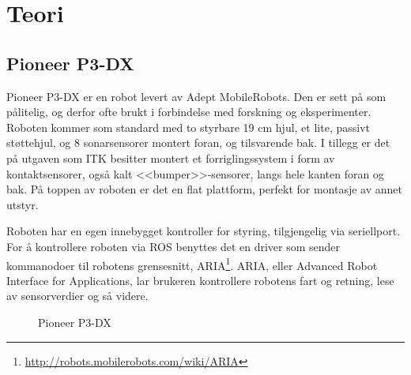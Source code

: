 
\chapter{Teori} %

\label{ch:teori} %


\section{Pioneer P3-DX}

Pioneer P3-DX er en robot levert av Adept MobileRobots. Den er sett på som pålitelig, og derfor ofte brukt i forbindelse med forskning og eksperimenter. Roboten kommer som standard med to styrbare 19 cm hjul, et lite, passivt støttehjul, og 8 sonarsensorer montert foran, og tilsvarende bak. I tillegg er det på utgaven som ITK besitter montert et forriglingssystem i form av kontaktsensorer, også kalt <<bumper>>-sensorer, langs hele kanten foran og bak. På toppen av roboten er det en flat plattform, perfekt for montasje av annet utstyr. 

Roboten har en egen innebygget kontroller for styring, tilgjengelig via seriellport. For å kontrollere roboten via ROS benyttes det en driver som sender kommanodoer til robotens grensesnitt, ARIA\footnote{\url{http://robots.mobilerobots.com/wiki/ARIA}}. ARIA, eller Advanced Robot Interface for Applications, lar brukeren kontrollere robotens fart og retning, lese av sensorverdier og så videre.

\begin{figure}[h!]
  \centering
  \caption{Pioneer P3-DX}
  \label{fig:pioneer}
\end{figure}

